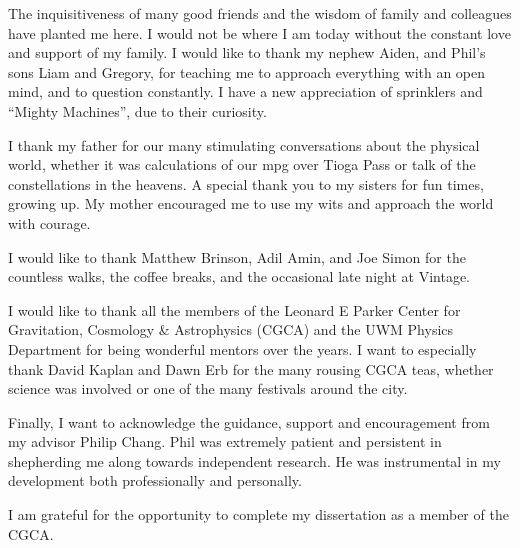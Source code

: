 \documentclass[12pt,notitlepage]{report}
\begin{document}
\dblspace

The inquisitiveness of many good friends and the wisdom of family and colleagues have planted me here.
I would not be where I am today without the constant love and support of my family. 
I would like to thank my nephew Aiden, and Phil's sons Liam and Gregory, for teaching me to approach everything with an open mind, and to question constantly.
I have a new appreciation of sprinklers and ``Mighty Machines'', due to their curiosity.

I thank my father for our many stimulating conversations about the physical world, whether it was calculations of our mpg over Tioga Pass or talk of the constellations in the heavens. %
A special thank you to my sisters for fun times, growing up. 
My mother encouraged me to use my wits and approach the world with courage.

I would like to thank Matthew Brinson, Adil Amin, and Joe Simon for the countless walks, the coffee breaks, and the occasional late night at Vintage. 

I would like to thank all the members of the Leonard E Parker Center for Gravitation, Cosmology \& Astrophysics (CGCA) and the UWM Physics Department 
for being wonderful mentors over the years. 
I want to especially thank David Kaplan and Dawn Erb for the many rousing CGCA teas, whether science was involved or one of the many festivals around the city. 

Finally, I want to acknowledge the guidance, support and encouragement from my advisor Philip Chang. 
Phil was extremely patient and persistent in shepherding me along towards independent research. 
He was instrumental in my development both professionally and personally. 

I am grateful for the opportunity to complete my dissertation as a member of the CGCA.

\newpage

%
\pagestyle{uwmheadings}

\pagestyle{fancy} \lhead{} \chead{} \rhead{} \lfoot{} \cfoot{\thepage} \rfoot{}
\end{document}
